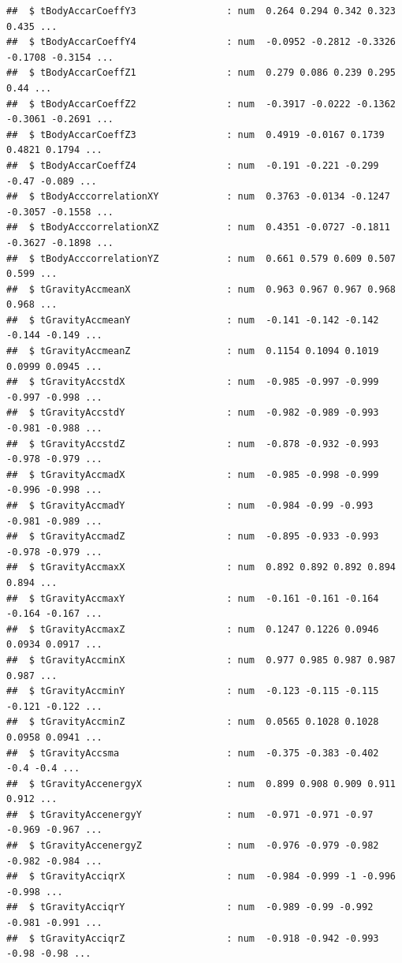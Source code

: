 \documentclass[
]{article}
\begin{document}
\begin{verbatim}
##  $ tBodyAccarCoeffY3                : num  0.264 0.294 0.342 0.323 0.435 ...
##  $ tBodyAccarCoeffY4                : num  -0.0952 -0.2812 -0.3326 -0.1708 -0.3154 ...
##  $ tBodyAccarCoeffZ1                : num  0.279 0.086 0.239 0.295 0.44 ...
##  $ tBodyAccarCoeffZ2                : num  -0.3917 -0.0222 -0.1362 -0.3061 -0.2691 ...
##  $ tBodyAccarCoeffZ3                : num  0.4919 -0.0167 0.1739 0.4821 0.1794 ...
##  $ tBodyAccarCoeffZ4                : num  -0.191 -0.221 -0.299 -0.47 -0.089 ...
##  $ tBodyAcccorrelationXY            : num  0.3763 -0.0134 -0.1247 -0.3057 -0.1558 ...
##  $ tBodyAcccorrelationXZ            : num  0.4351 -0.0727 -0.1811 -0.3627 -0.1898 ...
##  $ tBodyAcccorrelationYZ            : num  0.661 0.579 0.609 0.507 0.599 ...
##  $ tGravityAccmeanX                 : num  0.963 0.967 0.967 0.968 0.968 ...
##  $ tGravityAccmeanY                 : num  -0.141 -0.142 -0.142 -0.144 -0.149 ...
##  $ tGravityAccmeanZ                 : num  0.1154 0.1094 0.1019 0.0999 0.0945 ...
##  $ tGravityAccstdX                  : num  -0.985 -0.997 -0.999 -0.997 -0.998 ...
##  $ tGravityAccstdY                  : num  -0.982 -0.989 -0.993 -0.981 -0.988 ...
##  $ tGravityAccstdZ                  : num  -0.878 -0.932 -0.993 -0.978 -0.979 ...
##  $ tGravityAccmadX                  : num  -0.985 -0.998 -0.999 -0.996 -0.998 ...
##  $ tGravityAccmadY                  : num  -0.984 -0.99 -0.993 -0.981 -0.989 ...
##  $ tGravityAccmadZ                  : num  -0.895 -0.933 -0.993 -0.978 -0.979 ...
##  $ tGravityAccmaxX                  : num  0.892 0.892 0.892 0.894 0.894 ...
##  $ tGravityAccmaxY                  : num  -0.161 -0.161 -0.164 -0.164 -0.167 ...
##  $ tGravityAccmaxZ                  : num  0.1247 0.1226 0.0946 0.0934 0.0917 ...
##  $ tGravityAccminX                  : num  0.977 0.985 0.987 0.987 0.987 ...
##  $ tGravityAccminY                  : num  -0.123 -0.115 -0.115 -0.121 -0.122 ...
##  $ tGravityAccminZ                  : num  0.0565 0.1028 0.1028 0.0958 0.0941 ...
##  $ tGravityAccsma                   : num  -0.375 -0.383 -0.402 -0.4 -0.4 ...
##  $ tGravityAccenergyX               : num  0.899 0.908 0.909 0.911 0.912 ...
##  $ tGravityAccenergyY               : num  -0.971 -0.971 -0.97 -0.969 -0.967 ...
##  $ tGravityAccenergyZ               : num  -0.976 -0.979 -0.982 -0.982 -0.984 ...
##  $ tGravityAcciqrX                  : num  -0.984 -0.999 -1 -0.996 -0.998 ...
##  $ tGravityAcciqrY                  : num  -0.989 -0.99 -0.992 -0.981 -0.991 ...
##  $ tGravityAcciqrZ                  : num  -0.918 -0.942 -0.993 -0.98 -0.98 ...

\end{verbatim}
\end{document}
